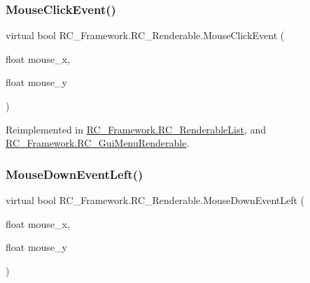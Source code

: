 \subsubsection{\texorpdfstring{Mouse\+Click\+Event()}{MouseClickEvent()}}
{\footnotesize\ttfamily virtual bool R\+C\+\_\+\+Framework.\+R\+C\+\_\+\+Renderable.\+Mouse\+Click\+Event (\begin{DoxyParamCaption}\item[{float}]{mouse\+\_\+x,  }\item[{float}]{mouse\+\_\+y }\end{DoxyParamCaption})\hspace{0.3cm}{\ttfamily [virtual]}}



Reimplemented in \mbox{\hyperlink{class_r_c___framework_1_1_r_c___renderable_list_ac275d3df45899b62e1378e01a100268d}{R\+C\+\_\+\+Framework.\+R\+C\+\_\+\+Renderable\+List}}, and \mbox{\hyperlink{class_r_c___framework_1_1_r_c___gui_menu_renderable_a211b5eebda9524d97f8dfeb1f8024f32}{R\+C\+\_\+\+Framework.\+R\+C\+\_\+\+Gui\+Menu\+Renderable}}.

\mbox{\label{class_r_c___framework_1_1_r_c___renderable_a41d144d6fad27f219d861e61a2d9796e}} 
\subsubsection{\texorpdfstring{Mouse\+Down\+Event\+Left()}{MouseDownEventLeft()}}
{\footnotesize\ttfamily virtual bool R\+C\+\_\+\+Framework.\+R\+C\+\_\+\+Renderable.\+Mouse\+Down\+Event\+Left (\begin{DoxyParamCaption}\item[{float}]{mouse\+\_\+x,  }\item[{float}]{mouse\+\_\+y }\end{DoxyParamCaption})\hspace{0.3cm}{\ttfamily [virtual]}}



